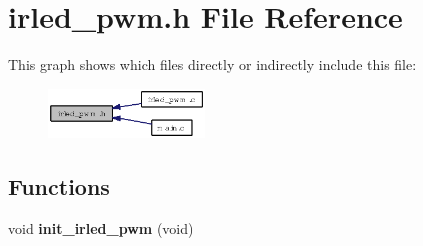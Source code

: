 \section{irled\_\-pwm.h File Reference}
\label{irled__pwm_8h}


This graph shows which files directly or indirectly include this file:\begin{figure}[H]
\begin{center}
\leavevmode
\includegraphics[width=118pt]{irled__pwm_8h__dep__incl}
\end{center}
\end{figure}
\subsection*{Functions}
\begin{CompactItemize}
\item 
void {\bf init\_\-irled\_\-pwm} (void)
\end{CompactItemize}
